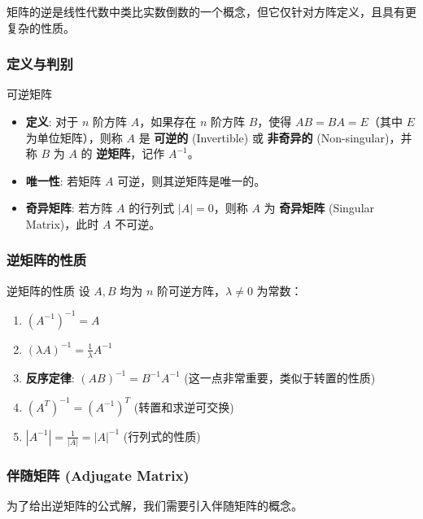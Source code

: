 \documentclass[a4paper,12pt]{ctexart}
\begin{document}
矩阵的逆是线性代数中类比实数倒数的一个概念，但它仅针对方阵定义，且具有更复杂的性质。

\subsubsection{定义与判别}
\begin{mydef}{可逆矩阵}{}
\begin{itemize}
    \item \textbf{定义}: 对于 $n$ 阶方阵 $A$，如果存在 $n$ 阶方阵 $B$，使得 $AB = BA = E$（其中 $E$ 为单位矩阵），则称 $A$ 是 \textbf{可逆的} (Invertible) 或 \textbf{非奇异的} (Non-singular)，并称 $B$ 为 $A$ 的 \textbf{逆矩阵}，记作 $A^{-1}$。
    \item \textbf{唯一性}: 若矩阵 $A$ 可逆，则其逆矩阵是唯一的。
    \item \textbf{奇异矩阵}: 若方阵 $A$ 的行列式 $|A| = 0$，则称 $A$ 为 \textbf{奇异矩阵} (Singular Matrix)，此时 $A$ 不可逆。
\end{itemize}
\end{mydef}



\subsubsection{逆矩阵的性质}
\begin{myprop}{逆矩阵的性质}{}
设 $A, B$ 均为 $n$ 阶可逆方阵，$\lambda \neq 0$ 为常数：
\begin{enumerate}
    \item $(A^{-1})^{-1} = A$
    \item $(\lambda A)^{-1} = \frac{1}{\lambda} A^{-1}$
    \item \textbf{反序定律}: $(AB)^{-1} = B^{-1}A^{-1}$ (这一点非常重要，类似于转置的性质)
    \item $(A^T)^{-1} = (A^{-1})^T$ (转置和求逆可交换)
    \item $|A^{-1}| = \frac{1}{|A|} = |A|^{-1}$ (行列式的性质)
\end{enumerate}
\end{myprop}

\newpage

\subsubsection{伴随矩阵 (Adjugate Matrix)}
为了给出逆矩阵的公式解，我们需要引入伴随矩阵的概念。
\end{document}
